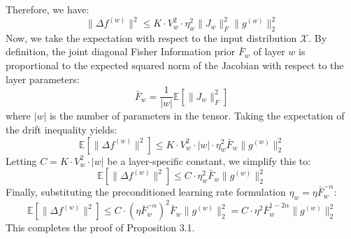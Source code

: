 \documentclass{article}
\theoremstyle{plain}
\theoremstyle{definition}
\theoremstyle{remark}
\begin{document}
Therefore, we have:
\begin{equation}
  \|\Delta f^{(w)}\|^2 \leq K \cdot V_w^2 \cdot \eta_w^2 \|J_w\|_F^2 \|g^{(w)}\|_2^2
\end{equation}
Now, we take the expectation with respect to the input distribution $\mathcal{X}$. By definition, the joint diagonal Fisher Information prior $\bar{F}_w$ of layer $w$ is proportional to the expected squared norm of the Jacobian with respect to the layer parameters:
\begin{equation}
  \bar{F}_w = \frac{1}{|w|} \mathbb{E} [\|J_w\|_F^2]
\end{equation}
where $|w|$ is the number of parameters in the tensor. Taking the expectation of the drift inequality yields:
\begin{equation}
  \mathbb{E}[\|\Delta f^{(w)}\|^2] \leq K \cdot V_w^2 \cdot |w| \cdot \eta_w^2 \bar{F}_w \|g^{(w)}\|_2^2
\end{equation}
Letting $C = K \cdot V_w^2 \cdot |w|$ be a layer-specific constant, we simplify this to:
\begin{equation}
  \mathbb{E}[\|\Delta f^{(w)}\|^2] \leq C \cdot \eta_w^2 \bar{F}_w \|g^{(w)}\|_2^2
\end{equation}
Finally, substituting the preconditioned learning rate formulation $\eta_w = \eta \bar{F}_w^{-\alpha}$:
\begin{equation}
  \mathbb{E}[\|\Delta f^{(w)}\|^2] \leq C \cdot (\eta \bar{F}_w^{-\alpha})^2 \bar{F}_w \|g^{(w)}\|_2^2 = C \cdot \eta^2 \bar{F}_w^{1-2\alpha} \|g^{(w)}\|_2^2
\end{equation}
This completes the proof of Proposition 3.1.
\end{document}
